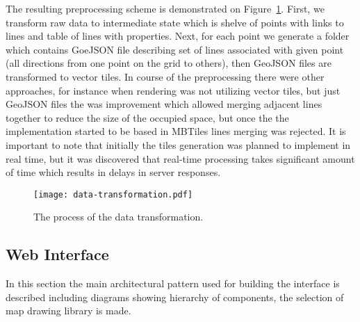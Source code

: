 The resulting preprocessing scheme is demonstrated on Figure~\ref{pic:transforming_data}.
First, we transform raw data to intermediate state which is shelve of points with links to lines
and table of lines with properties. Next, for each point we generate a folder which contains
GoeJSON file describing set of lines associated with given point (all directions from one point on the grid
to others), then GeoJSON files are transformed to vector tiles. In course of the preprocessing
there were other approaches, for instance when rendering was not utilizing vector tiles, but
just GeoJSON files the was improvement which allowed merging adjacent lines together to reduce
the size of the occupied space, but once the the implementation started to be based in MBTiles lines
merging was rejected. It is important to note that initially the tiles generation was
planned to implement in real time, but it was discovered that real-time processing takes significant
amount of time which results in delays in server responses.

\begin{figure}[h]
  \centering
  \texttt{[image: data-transformation.pdf]}
  \caption{The process of the data transformation.}
  \label{pic:transforming_data}
\end{figure}

\subsection{Web Interface}

In this section the main architectural pattern used for building the interface is described
including diagrams showing hierarchy of components, the selection of map drawing library is made.


